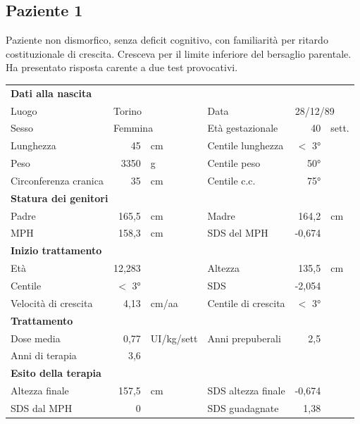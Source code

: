 \clearpage

\subsection*{Paziente 1} %

Paziente non dismorfico, senza deficit cognitivo, con familiarità per ritardo costituzionale di crescita. 
Cresceva per il limite inferiore del bersaglio parentale.
Ha presentato risposta carente a due test provocativi.

\begin{table}[!h]
\begin{tabular}{lrllrl}
\toprule
\multicolumn{6}{l}{\textbf{Dati alla nascita}}\\
Luogo 		& \multicolumn{2}{l}{Torino} 	& Data 					& \multicolumn{2}{l}{28/12/89} 	\\
Sesso 		& \multicolumn{2}{l}{Femmina} 	& Età gestazionale 		& 40 		& sett.\\
Lunghezza 	& 45 		& cm 				& Centile lunghezza		& $<$ 3° 		\\
Peso 		& 3350 		& g					& Centile peso			& 50° \\
Circonferenza cranica	& 35 		& cm 	& Centile c.c.			& 75° \\
\midrule
\multicolumn{6}{l}{\textbf{Statura dei genitori}}\\
Padre 		& 165,5 & cm 	& Madre 				& 164,2 & cm \\
MPH 		& 158,3 & cm 	& SDS del MPH 			& -0,674\\
\midrule
\multicolumn{6}{l}{\textbf{Inizio trattamento}} \\
Età	& 12,283 & 		& Altezza 				& 135,5 & cm  \\
Centile & $<$ 3° 	 &		& SDS		& -2,054 \\
Velocità di crescita & 4,13 & cm/aa	& Centile di crescita & $<$ 3°\\
\midrule
\multicolumn{6}{l}{\textbf{Trattamento}} \\
Dose media		& 0,77 & UI/kg/sett & Anni prepuberali & 2,5\\
Anni di terapia & 3,6\\
\midrule
\multicolumn{6}{l}{\textbf{Esito della terapia}} \\
Altezza finale			& 157,5 & cm 	& SDS altezza finale		& -0,674\\
SDS dal MPH				& 0 	& 		& SDS guadagnate 			& 1,38\\
\bottomrule
\end{tabular}
\end{table}
\clearpage

